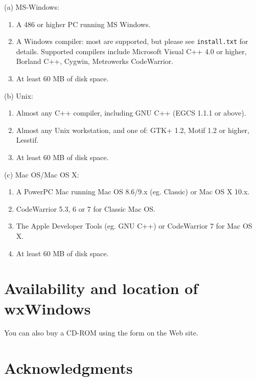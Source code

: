 (a) MS-Windows:

\begin{enumerate}\itemsep=0pt
\item A 486 or higher PC running MS Windows.
\item A Windows compiler: most are supported, but please see {\tt install.txt} for
details. Supported compilers include Microsoft Visual C++ 4.0 or higher, Borland C++, Cygwin,
Metrowerks CodeWarrior.
\item At least 60 MB of disk space.
\end{enumerate}

(b) Unix:

\begin{enumerate}\itemsep=0pt
\item Almost any C++ compiler, including GNU C++ (EGCS 1.1.1 or above).
\item Almost any Unix workstation, and one of: GTK+ 1.2, Motif 1.2 or higher, Lesstif.
\item At least 60 MB of disk space.
\end{enumerate}

(c) Mac OS/Mac OS X:

\begin{enumerate}\itemsep=0pt
\item A PowerPC Mac running Mac OS 8.6/9.x (eg. Classic) or Mac OS X 10.x.
\item CodeWarrior 5.3, 6 or 7 for Classic Mac OS.
\item The Apple Developer Tools (eg. GNU C++) or CodeWarrior 7 for Mac OS X.
\item At least 60 MB of disk space.
\end{enumerate}

\section{Availability and location of wxWindows}


You can also buy a CD-ROM using the form on the Web site.

\section{Acknowledgments}

